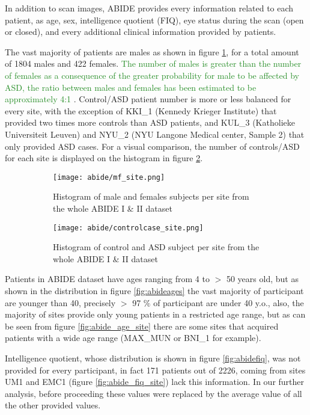 \documentclass[11pt]{report}
\begin{document}
In addition to scan images, ABIDE provides every information related to each patient, as age, sex, intelligence quotient (FIQ), eye status during the scan (open or closed), and every additional clinical information provided by patients.

The vast majority of patients are males as shown in figure \ref{fig:mf_site}, for a total amount of 1804 males and 422 females.
\textcolor{ForestGreen}{The number of males is greater than the number of females as a consequence of the greater probability for male to be affected by ASD, the ratio between males and females has been estimated to be approximately 4:1 \cite{fombonne2009}}.
Control/ASD patient number is more or less balanced for every site, with the exception of KKI\_1 (Kennedy Krieger Institute) that provided two times more controls than ASD patients, and KUL\_3 (Katholieke Universiteit Leuven) and NYU\_2 (NYU Langone Medical center, Sample 2) that only provided ASD cases. For a visual comparison, the number of controls/ASD for each site is displayed on the histogram in figure \ref{fig:controlcase_site}.

\begin{figure}[h]
\centering
\begin{subfigure}{0.9\textwidth}
\texttt{[image: abide/mf\_site.png]}
\caption{Histogram of male and females subjects per site from the whole ABIDE I \& II dataset}
\label{fig:mf_site}
\end{subfigure}
\begin{subfigure}{0.9\textwidth}
\texttt{[image: abide/controlcase\_site.png]}
\caption{Histogram of control and ASD subject per site from the whole ABIDE I \& II dataset}
\label{fig:controlcase_site}
\end{subfigure}
\caption{}
\label{}
\end{figure}


Patients in ABIDE dataset have ages ranging from 4 to $>$ 50 years old, but as shown in the distribution in figure \ref{fig:abideages} the vast majority of participant are younger than 40, precisely $>$ 97 $\%$ of participant are under 40 y.o., also, the majority of sites provide only young patients in a restricted age range, but  as can be seen from figure \ref{fig:abide_age_site} there are some sites that acquired patients with a wide age range (MAX\_MUN or BNI\_1 for example).


Intelligence quotient, whose distribution is shown in figure \ref{fig:abidefiq}, was not provided for every participant, in fact 171 patients out of 2226, coming from sites UM1 and EMC1 (figure \ref{fig:abide_fiq_site}) lack this information.
In our further analysis, before proceeding these values were replaced by the average value of all the other provided values.
\end{document}
